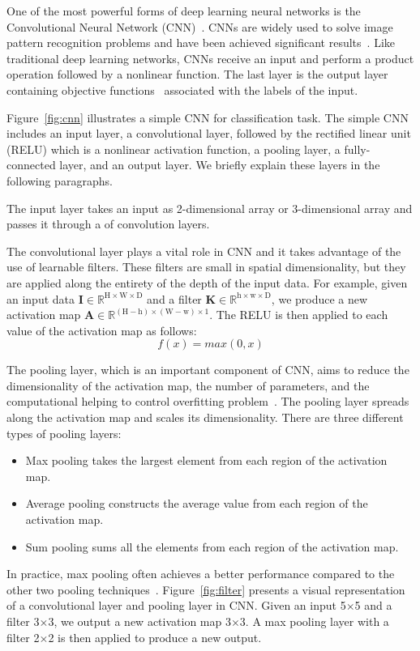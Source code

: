One of the most powerful forms of deep learning neural networks is the Convolutional Neural Network (CNN)~\cite{lecun2015deep}. CNNs are widely used to solve image pattern recognition problems and have been achieved significant results~\cite{karpathy2014large, lawrence1997face, krizhevsky2012imagenet}. Like traditional deep learning networks, CNNs receive an input and perform a product operation followed by a nonlinear function. The last layer is the output layer containing objective functions~\cite{zhao2017loss} associated with the labels of the input.

Figure~\ref{fig:cnn} illustrates a simple CNN for classification task. The simple CNN includes an input layer, a convolutional layer, followed by the rectified linear unit (RELU) which is a nonlinear activation function, a pooling layer, a fully-connected layer, and an output layer. We briefly explain these layers in the following paragraphs. 

The input layer takes an input as 2-dimensional array or 3-dimensional array and passes it through a of convolution layers.

The convolutional layer plays a vital role in CNN and it takes advantage of the use of learnable filters. These filters are small in spatial dimensionality, but they are applied along the entirety of the depth of the input data. For example, given an input data $\textbf{I} \in \mathbb{R}^{\text{H} \times \text{W} \times \text{D}}$ and a filter $\textbf{K} \in \mathbb{R}^{\text{h} \times \text{w} \times \text{D}}$, we produce a new activation map $\textbf{A} \in \mathbb{R}^{(\text{H} - \text{h}) \times (\text{W} - \text{w}) \times 1}$. The RELU is then applied to each value of the activation map as follows:
\begin{equation}
\label{eq:relu}
f(x) = max(0, x)   
\end{equation}

The pooling layer, which is an important component of CNN, aims to reduce the dimensionality of the activation map, the number of parameters, and the computational helping to control overfitting problem~\cite{tolias2015particular}. The pooling layer spreads along the activation map and scales its dimensionality. There are three different types of pooling layers:
\begin{itemize}
	\item Max pooling takes the largest element from each region of the activation map.
	\item Average pooling constructs the average value from each region of the activation map.
	\item Sum pooling sums all the elements from each region of the activation map. 
\end{itemize}
In practice, max pooling often achieves a better performance compared to the other two pooling techniques~\cite{zeiler2013stochastic}. Figure~\ref{fig:filter} presents a visual representation of a convolutional layer and pooling layer in CNN. Given an input 5$\times$5 and a filter 3$\times$3, we output a new activation map 3$\times$3. A max pooling layer with a filter 2$\times$2 is then applied to produce a new output. 

